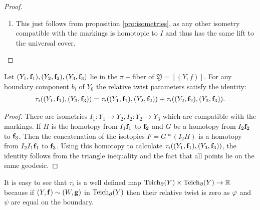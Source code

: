 \begin{proof}
\begin{enumerate}
    \item This just follows from proposition \ref{pro:isometries}, as any other isometry compatible with the markings is homotopic to $I$ and thus has the same lift to the universal cover.
  \end{enumerate}
\end{proof}
\begin{proposition}
  Let $(Y_1,\mathbf{f}_1), (Y_2,\mathbf{f}_2), (Y_3,\mathbf{f}_3)$ lie in the $\pi-$fiber of $ \mathfrak{Y} = [(Y,f)]$. For any boundary component $b_i$ of $Y_0$ the relative twist parameters satisfy the identity:
  \begin{align*}
    \tau_i((Y_1,\mathbf{f}_1),(Y_3,\mathbf{f}_3)) = \tau_i((Y_1,\mathbf{f}_1),(Y_2,\mathbf{f}_2)) + \tau_i((Y_2,\mathbf{f}_2),(Y_3,\mathbf{f}_3)).
  \end{align*}
\end{proposition}
\begin{proof}
  There are isometries $I_1:Y_1\to Y_2, I_2:Y_2\to Y_3$ which are compatible with the markings. If $H$ is the homotopy from $I_1\mathbf{f}_1$ to $\mathbf{f}_2$ and $G$ be a homotopy from $I_2\mathbf{f}_2$ to $\mathbf{f}_3$. Then the concatenation of the isotopies $F = G*(I_2H)$ is a homotopy from $I_2I_1\mathbf{f}_1$ to $\mathbf{f}_3$. Using this homotopy to calculate $\tau_i((Y_1,\mathbf{f}_1),(Y_3,\mathbf{f}_3))$, the identity follows from the triangle inequality and the fact that all points lie on the same geodesic.
\end{proof}
It is easy to see that $\tau_i$ is a well defined map $\text{Teich}_\partial(Y)\times \text{Teich}_\partial(Y)\to \mathbb{R}$ because if $(Y,\mathbf{f}) \sim (W,\mathbf{g})$ in $\text{Teich}_\partial(Y)$ then their relative twist is zero as $\varphi$ and $\psi$ are equal on the boundary.\\ 

